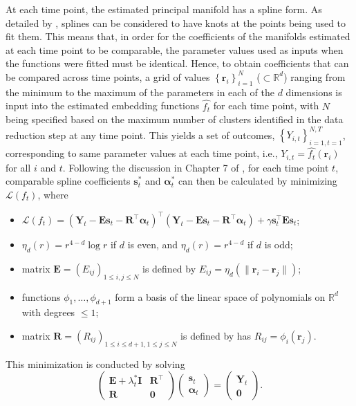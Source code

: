 \documentclass[11pt,reqno]{article}
\newcommand{\T}{\intercal}
\theoremstyle{definition}
\begin{document}
At each time point, the estimated principal manifold has a spline form. As detailed by \cite{greenSilverman1994}, splines can be considered to have knots at the points being used to fit them. This means that, in order for the coefficients of the manifolds estimated at each time point to be comparable, the parameter values used as inputs when the functions were fitted must be identical. Hence, to obtain coefficients that can be compared across time points, a grid of values $\left\{\boldsymbol{r}_i\right\}_{i=1}^{N}$ ($\subset\mathbb{R}^d$) ranging from the minimum to the maximum of the parameters in each of the $d$ dimensions is input into the estimated embedding functions $\widehat{f_t}$ for each time point, with $N$ being specified based on the maximum number of clusters identified in the data reduction step at any time point. This yields a set of outcomes, $\left\{Y_{i,t}\right\}_{i=1, t = 1}^{N, T}$, corresponding to same parameter values at each time point, i.e., $Y_{i,t}=\widehat{f_t}(\boldsymbol{r}_i)$ for all $i$ and $t$. Following the discussion in Chapter 7 of \cite{greenSilverman1994}, for each time point $t$, comparable spline coefficients $\boldsymbol{s}_t^*$ and $\boldsymbol{\alpha}_t^*$ can then be calculated by minimizing $\mathcal{L}(f_t)$, where
\begin{itemize}
    \item $\mathcal{L}(f_t) = (\boldsymbol{Y}_t - \boldsymbol{E}\boldsymbol{s}_t - \boldsymbol{R}^\T\boldsymbol{\alpha}_t)^\T(\boldsymbol{Y}_t - \boldsymbol{E}\boldsymbol{s}_t - \boldsymbol{R}^\T\boldsymbol{\alpha}_t) + \gamma\boldsymbol{s}_t^\T \boldsymbol{E}\boldsymbol{s}_t$;
    \item $\eta_{d}(r) = r^{4 - d}\log r$ if $d$ is even, and $\eta_d(r) = r^{4-d}$ if $d$ is odd;
    \item matrix $\boldsymbol{E}=(E_{ij})_{1\le i,j\le N}$ is defined by $E_{ij} = \eta_{d}(\|\boldsymbol{r}_i - \boldsymbol{r}_j\|)$;
    \item functions $\phi_1,\ldots,\phi_{d+1}$ form a basis of the linear space of polynomials on $\mathbb{R}^d$ with degrees $\le1$;
    \item matrix $\boldsymbol{R}=(R_{ij})_{1\le i\le d+1,1\le j\le N}$ is defined by has $R_{ij} = \phi_i(\boldsymbol{r}_j)$.
\end{itemize}
This minimization is conducted by solving
\begin{equation}
  \left(
    \begin{array}{cc}
      \boldsymbol{E} + \lambda_t^* \boldsymbol{I} & \boldsymbol{R}^\T \\
      \boldsymbol{R} & \boldsymbol{0}
    \end{array}
  \right)\left(
    \begin{array}{c}
      \boldsymbol{s}_t \\
      \boldsymbol{\alpha}_t
    \end{array}
  \right) = \left(
    \begin{array}{c}
      \boldsymbol{Y}_t \\
      \boldsymbol{0}
    \end{array}
  \right). \label{eq:13}
\end{equation}
\end{document}
